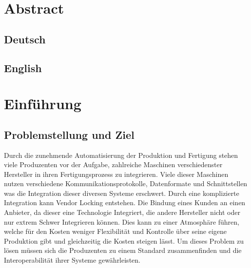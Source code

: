 \documentclass[a4paper, 12pt, oneside]{scrbook}
\begin{document}
	\frontmatter
	
	
	\tableofcontents
	\listoffigures
	\listoftables
	\nocite{*}

	\mainmatter
	
	\chapter*{Abstract}
	
	\section*{Deutsch}
	
	
	\section*{English}
	
	\pagebreak
	\chapter{Einführung}
	
	
	
	\section{Problemstellung und Ziel}
	
	
	 Durch die zunehmende Automatisierung der Produktion und Fertigung stehen viele Produzenten vor der Aufgabe, zahlreiche Maschinen verschiedenster Hersteller in ihren Fertigungsprozess zu integrieren. Viele dieser Maschinen nutzen verschiedene Kommunikationsprotokolle, Datenformate und Schnittstellen was die Integration dieser diversen Systeme erschwert. Durch eine komplizierte Integration kann Vendor Locking entstehen. Die Bindung eines Kunden an einen Anbieter, da dieser eine Technologie Integriert, die andere Hersteller nicht oder nur extrem Schwer Integrieren können. Dies kann zu einer Atmosphäre führen, welche für den Kosten weniger Flexibilität und Kontrolle über seine eigene Produktion gibt und gleichzeitig die Kosten steigen lässt. Um dieses Problem zu lösen müssen sich die Produzenten zu einem Standard zusammenfinden und die Interoperabilität ihrer Systeme gewährleisten.
	
\end{document}
